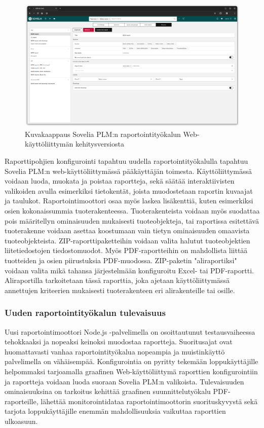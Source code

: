 \begin{figure}[tbh]
\includegraphics[width=1\textwidth]{img/RAT.png}
\caption{Kuvakaappaus Sovelia PLM:n raportointityökalun Web-käyttöliittymän kehitysversiosta\label{fig:RAT}}
\end{figure}

Raporttipohjien konfigurointi tapahtuu uudella raportointityökalulla tapahtuu Sovelia PLM:n web-käyttöliittymässä pääkäyttäjän toimesta. Käyttöliittymässä voidaan luoda, muokata ja poistaa raportteja, sekä säätää interaktiivisten valikoiden avulla esimerkiksi tietokentät, joista muodostetaan raportin kuvaajat ja taulukot. Raportointimoottori osaa myös laskea lisäkenttiä, kuten esimerkiksi osien kokonaissummia tuoterakenteessa. Tuoterakenteista voidaan myös suodattaa pois määritellyn ominaisuuden mukaisesti tuoteobjekteja, tai raportissa esitettävä tuoterakenne voidaan asettaa koostumaan vain tietyn ominaisuuden omaavista tuoteobjekteista. ZIP-raporttipaketteihin voidaan valita halutut tuoteobjektien liitetiedostojen tiedostomuodot. Myös PDF-raportteihin on mahdollista liittää tuotteiden ja osien piirustuksia PDF-muodossa. ZIP-paketin "aliraportiksi" voidaan valita mikä tahansa järjestelmään konfiguroitu Excel- tai PDF-raportti. Aliraportilla tarkoitetaan tässä raporttia, joka ajetaan käyttöliittymässä annettujen kriteerien mukaisesti tuoterakenteen eri alirakenteille tai osille.


\subsubsection{Uuden raportointityökalun tulevaisuus}

Uusi raportointimoottori Node.js -palvelimella on osoittautunut testausvaiheessa tehokkaaksi ja nopeaksi keinoksi muodostaa raportteja. Suoritusajat ovat huomattavasti vanhaa raportointityökalua nopeampia ja muistinkäyttö palvelimella on vähäisempää. Konfigurointia on pyritty tekemään loppukäyttäjille helpommaksi tarjoamalla graafinen Web-käyttöliittymä raporttien konfigurointiin ja raportteja voidaan luoda suoraan Sovelia PLM:n valikoista. Tulevaisuuden ominaisuuksina on tarkoitus kehittää graafinen suunnittelutyökalu PDF-raporteille, lähettää monitorointidataa raportointimoottorin suorituskyvystä sekä tarjota loppukäyttäjille enemmän mahdollisuuksia vaikuttaa raporttien ulkoasuun.


